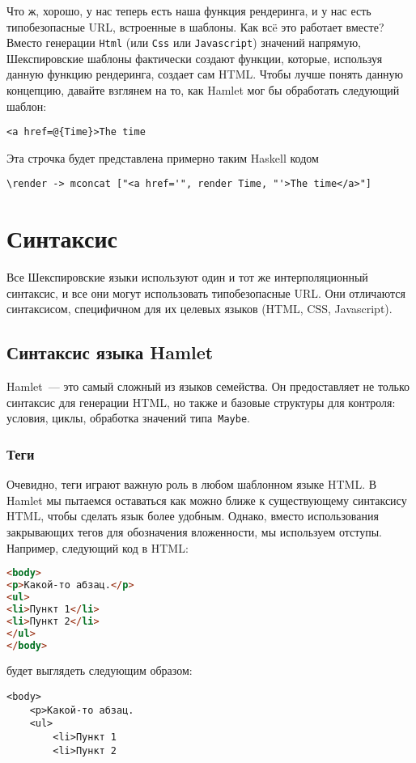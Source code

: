 Что ж, хорошо, у нас теперь есть наша функция рендеринга, и у нас есть
типобезопасные URL, встроенные в шаблоны. Как всë это работает вместе?  Вместо
генерации \lstinline!Html! (или \lstinline!Css! или \lstinline!Javascript!)
значений напрямую, Шекспировские шаблоны фактически создают функции, которые,
используя данную функцию рендеринга, создает сам HTML. Чтобы лучше понять
данную концепцию, давайте взглянем на то, как Hamlet мог бы обработать
следующий шаблон:

\begin{lstlisting}
<a href=@{Time}>The time
\end{lstlisting}

Эта строчка будет представлена примерно таким Haskell кодом

\begin{lstlisting}
\render -> mconcat ["<a href='", render Time, "'>The time</a>"]
\end{lstlisting}

\section{Синтаксис}

Все Шекспировские языки используют один и тот же интерполяционный синтаксис, и
все они могут использовать типобезопасные URL. Они отличаются синтаксисом,
специфичном для их целевых языков (HTML, CSS, Javascript).

\subsection{Синтаксис языка Hamlet}
Hamlet~--- это самый сложный из языков семейства. Он предоставляет не только
синтаксис для генерации HTML, но также и базовые структуры для контроля:
условия, циклы, обработка значений типа~\lstinline'Maybe'.

\subsubsection{Теги}

Очевидно, теги играют важную роль в любом шаблонном языке HTML. В
Hamlet мы пытаемся оставаться как можно ближе к существующему синтаксису
HTML, чтобы сделать язык более удобным. Однако, вместо использования
закрывающих тегов для обозначения вложенности, мы используем отступы. Например,
следующий код в HTML:
\begin{lstlisting}[language=HTML]
<body>
<p>Какой-то абзац.</p>
<ul>
<li>Пункт 1</li>
<li>Пункт 2</li>
</ul>
</body>
\end{lstlisting}
будет выглядеть следующим образом:
\begin{lstlisting}
<body>
    <p>Какой-то абзац.
    <ul>
        <li>Пункт 1
        <li>Пункт 2
\end{lstlisting}

